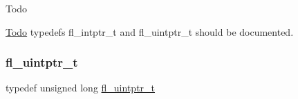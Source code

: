 \begin{DoxyRefDesc}{Todo}
\item[\hyperlink{todo__todo000020}{Todo}]typedef\textquotesingle{}s fl\+\_\+intptr\+\_\+t and fl\+\_\+uintptr\+\_\+t should be documented. \end{DoxyRefDesc}
\mbox{\label{_fl___widget_8_h_a0c2a2b4e6f4413cf8fbdda84b75bd420}} 
\subsubsection{\texorpdfstring{fl\+\_\+uintptr\+\_\+t}{fl\_uintptr\_t}}
{\footnotesize\ttfamily typedef unsigned long \hyperlink{_fl___widget_8_h_a0c2a2b4e6f4413cf8fbdda84b75bd420}{fl\+\_\+uintptr\+\_\+t}}

